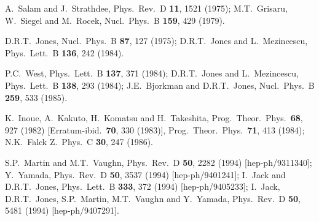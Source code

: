 \documentclass[12pt]{article}
\begin{document}
\begin{thebibliography}{999}
A.~Salam and J.~Strathdee, 
  Phys.\ Rev.\ D {\bf 11}, 1521 (1975);
M.T.~Grisaru, W.~Siegel and M.~Rocek, 
  Nucl.\ Phys.\ B {\bf 159}, 429 (1979).

D.R.T.~Jones,
  Nucl.\ Phys.\ B {\bf 87}, 127 (1975);
D.R.T.~Jones and L.~Mezincescu,
  Phys.\ Lett.\ B {\bf 136}, 242 (1984). 

P.C.~West,
  Phys.\ Lett.\ B {\bf 137}, 371 (1984);
D.R.T.~Jones and L.~Mezincescu,
  Phys.\ Lett.\ B {\bf 138}, 293 (1984);
J.E.~Bjorkman and D.R.T.~Jones,
  Nucl.\ Phys.\ B {\bf 259}, 533 (1985).

K.~Inoue, A.~Kakuto, H.~Komatsu and H.~Takeshita,
  Prog.\ Theor.\ Phys.\  {\bf 68}, 927 (1982)
  [Erratum-ibid.\  {\bf 70}, 330 (1983)],
  Prog.\ Theor.\ Phys.\  {\bf 71}, 413 (1984);
N.K.~Falck 
  Z.\ Phys.\ C {\bf 30}, 247 (1986).

S.P.~Martin and M.T.~Vaughn, 
  Phys.\ Rev.\ D {\bf 50}, 2282 (1994)
  [hep-ph/9311340];
Y.~Yamada, 
  Phys.\ Rev.\ D {\bf 50}, 3537 (1994)
  [hep-ph/9401241];
I.~Jack and D.R.T.~Jones, 
  Phys.\ Lett.\ B {\bf 333}, 372 (1994)
  [hep-ph/9405233];
I.~Jack, D.R.T.~Jones, S.P.~Martin, M.T.~Vaughn and Y.~Yamada, 
  Phys.\ Rev.\ D {\bf 50}, 5481 (1994)
  [hep-ph/9407291].


\end{thebibliography}
\end{document}
